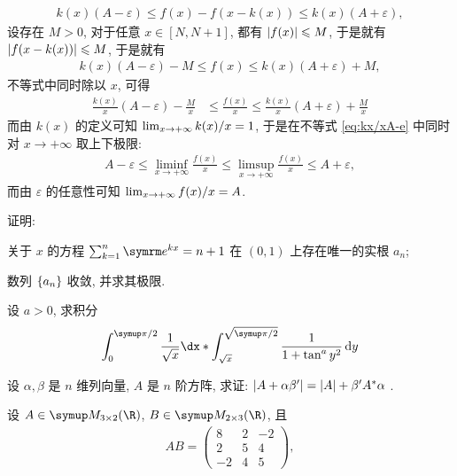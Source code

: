 \begin{exercise}[series=exer]
\begin{answer}
\begin{align*}
          k(x)(A - \varepsilon) \le f(x) - f(x - k(x)) \le k(x)(A + \varepsilon),
      \end{align*}
      设存在 $ M > 0 $, 对于任意 $ x \in [N, N + 1] $, 都有 $ \abs{f(x)} \leqslant M $, 于是就有 $ \abs{f(x - k(x))} \leqslant M $, 于是就有
      \begin{align*}
          k(x)(A - \varepsilon) - M \le f(x) \le k(x)(A + \varepsilon) + M,
      \end{align*}
      不等式中同时除以 $ x $, 可得
      \begin{align}\label{eq:kx/xA-e}
          \frac{k(x)}{x}(A - \varepsilon) - \frac{M}{x} & \le \frac{f(x)}{x} \le \frac{k(x)}{x}(A + \varepsilon) + \frac{M}{x}
      \end{align}
      而由 $ k(x) $ 的定义可知 $ \lim_{x \to +\infty}k(x)/x = 1 $, 于是在不等式 \eqref{eq:kx/xA-e} 中同时对 $ x \to +\infty $ 取上下极限:
      \begin{align*}
          A - \varepsilon \le \liminf_{x \to +\infty} \frac{f(x)}{x} \le \limsup_{x \to +\infty} \frac{f(x)}{x} \le A + \varepsilon,
      \end{align*}
      而由 $ \varepsilon $ 的任意性可知 $ \lim_{x \to +\infty} f(x)/x = A $.
  \end{answer}
  \item 证明: \begin{exercise}
      \item 关于 $ x $ 的方程 $ \sum_{k=1}^{n} \me^{kx} = n + 1 $ 在 $ (0, 1) $ 上存在唯一的实根 $ a_{n} $;
      \item 数列 $ \qty{a_{n}} $ 收敛, 并求其极限.
  \end{exercise}
  \item 设 $ a > 0 $, 求积分
  \begin{align*}
      \int_{0}^{\pi/2} \frac{1}{\sqrt{x}} \dx* \int_{\sqrt{x}}^{\sqrt{\pi/2}} \frac{1}{1 + \tan^{a}y^{2}} \dd{y}
  \end{align*}
  \item 设 $ \alpha, \beta $ 是 $ n $ 维列向量, $ A $ 是 $ n $ 阶方阵, 求证: $ \abs{A + \alpha\beta'} = \abs{A} + \beta'A^{*}\alpha $ .
  \item 设 $ A \in \MM[\R][3\times 2] $, $ B \in \MM[\R][2 \times 3] $, 且
  \begin{align*}
      AB = \begin{pmatrix}
          8 & 2 & -2 \\
          2 & 5 & 4 \\
          -2 & 4 & 5
      \end{pmatrix},

\end{align*}
\end{exercise}
